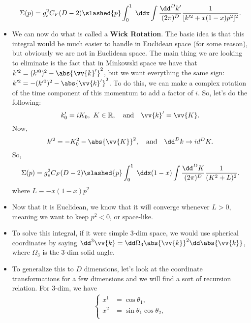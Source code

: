 \begin{itemize}
        \begin{equation*}
            \Sigma(p) = g_s^2 C_F (D-2) \slashed{p} \int_0^1 \;\ddx \int \frac{\dd^Dk'}{(2\pi)^D}  \frac{1}{[k'^2 + x(1-x)p^2]^2}.
        \end{equation*}
    \item We can now do what is called a \textbf{Wick Rotation}. The basic idea is that this integral would be much easier to handle in Euclidean space (for some reason), but obviously we are not in Euclidean space. The main thing we are looking to eliminate is the fact that in Minkowski space we have that $k^{\prime 2} = (k^{\prime 0})^2 - \abs{\vv{k}'}^2$, but we want everything the same sign: $k^{\prime 2} = -(k^{\prime 0})^2 - \abs{\vv{k}'}^2$. To do this, we can make a complex rotation of the time component of this momentum to add a factor of $i$. So, let's do the following:
        \begin{equation*}
            k'_0 = iK_0, \ K \in \mathbb{R}, \quad \mathrm{and} \quad \vv{k}' = \vv{K}.
        \end{equation*}
        Now,
        \begin{equation*}
            k^{\prime 2} = -K_0^2 - \abs{\vv{K}}^2, \quad \mathrm{and} \quad \dd^Dk \rightarrow id^DK.
        \end{equation*}
        So,
        \begin{equation*}
            \Sigma(p) = g_s^2 C_F (D-2) \slashed{p} \int_0^1 \;\ddx (1-x) \int \frac{\dd^DK}{(2\pi)^D} \frac{1}{(K^2 + L)^2}.
        \end{equation*}
        where $L \equiv -x(1-x)p^2$
    \item Now that it is Euclidean, we know that it will converge whenever $L>0$, meaning we want to keep $p^2<0$, or space-like.
    \item To solve this integral, if it were simple 3-dim space, we would use spherical coordinates by saying $\dd^3\vv{k} = \dd\Omega_3 \abs{\vv{k}}^2 \dd\abs{\vv{k}}$, where $\Omega_3$ is the 3-dim solid angle.
    \item To generalize this to $D$ dimensions, let's look at the coordinate transformations for a few dimensions and we will find a sort of recursion relation. For 3-dim, we have
        \begin{equation*}
            \begin{alignedat}{1}
            \begin{cases}
                x^1 &= \cos\theta_1, \\
                x^2 &= \sin\theta_1\cos\theta_2, \\

\end{cases}
\end{alignedat}
\end{equation*}
\end{itemize}
